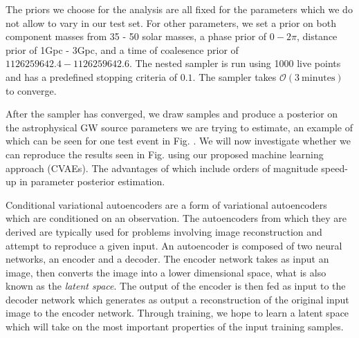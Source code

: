 \documentclass[%
showpacs,
 amsmath,amssymb,
 aps,
 twocolumn,
 prl,
 reprint,
floatfix,
]{revtex4-1}
\begin{document}
%
%
The priors we choose for the analysis are all fixed for the parameters which we do not 
allow to vary in our test set. For other parameters, we set a prior on both component masses from 
35 - 50 solar masses, a phase prior of $0 - 2\pi$, distance prior of 1Gpc - 3Gpc, and 
a time of coalesence prior of $1126259642.4 - 1126259642.6$. The nested sampler is run 
using 1000 live points and has a predefined stopping criteria of $0.1$. The sampler takes 
$\mathcal{O}(3 \: \textrm{minutes})$ to converge.

%
% 
After the sampler has converged, we draw samples and produce a posterior on the 
astrophysical GW source parameters we are trying to estimate, an example of which 
can be seen for one test event in Fig. 
. We will now investigate 
whether we can reproduce the results seen in Fig. 
using our 
proposed machine learning approach (CVAEs). The advantages of which include orders 
of magnitude speed-up in parameter posterior estimation. 

   

%
%
Conditional variational autoencoders are a form of variational autoencoders 
which are conditioned on an observation. The autoencoders from which they 
are derived are typically used 
for problems involving image reconstruction and attempt to reproduce a  
given input. An autoencoder is composed of two neural networks, an encoder 
and a decoder. The encoder network takes as input an image, then converts 
the image into a lower dimensional space, what is also known as the {\it{latent space}}. 
The output of the encoder is then fed as input to the decoder network 
which generates as output a reconstruction of the original input
image to the encoder network. Through training, we hope to learn a latent space which will 
take on the most important properties of the input training samples.  
\end{document}
